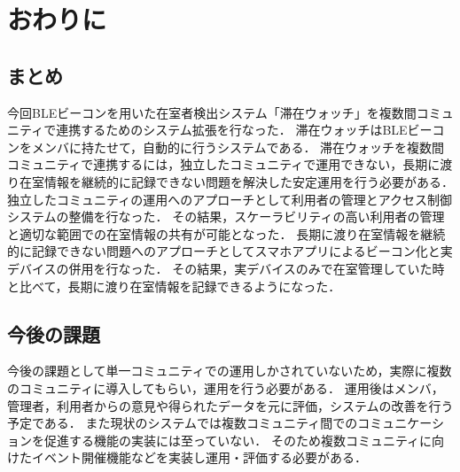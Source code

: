 \chapter{おわりに}
\thispagestyle{myheadings}

\section{まとめ}

今回BLEビーコンを用いた在室者検出システム「滞在ウォッチ」を複数間コミュニティで連携するためのシステム拡張を行なった．
滞在ウォッチはBLEビーコンをメンバに持たせて，自動的に行うシステムである．
滞在ウォッチを複数間コミュニティで連携するには，独立したコミュニティで運用できない，長期に渡り在室情報を継続的に記録できない問題を解決した安定運用を行う必要がある．
独立したコミュニティの運用へのアプローチとして利用者の管理とアクセス制御システムの整備を行なった．
その結果，スケーラビリティの高い利用者の管理と適切な範囲での在室情報の共有が可能となった．
長期に渡り在室情報を継続的に記録できない問題へのアプローチとしてスマホアプリによるビーコン化と実デバイスの併用を行なった．
その結果，実デバイスのみで在室管理していた時と比べて，長期に渡り在室情報を記録できるようになった．


\section{今後の課題}


今後の課題として単一コミュニティでの運用しかされていないため，実際に複数のコミュニティに導入してもらい，運用を行う必要がある．
運用後はメンバ，管理者，利用者からの意見や得られたデータを元に評価，システムの改善を行う予定である．
また現状のシステムでは複数コミュニティ間でのコミュニケーションを促進する機能の実装には至っていない．
そのため複数コミュニティに向けたイベント開催機能などを実装し運用・評価する必要がある．



